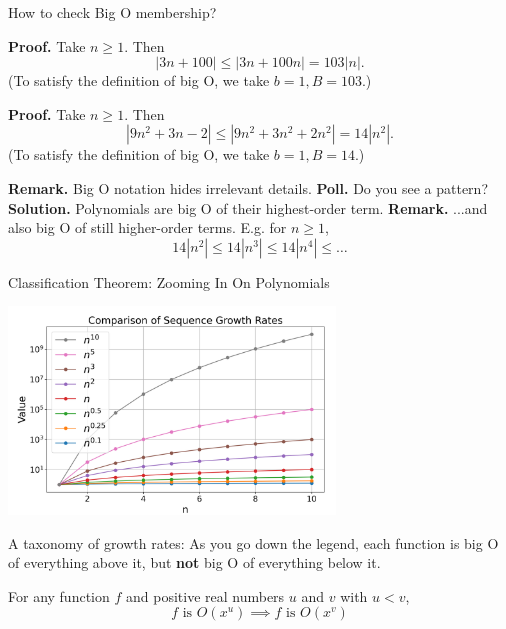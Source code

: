 \documentclass[10pt]{beamer}
\begin{document}
\begin{frame}{How to check Big O membership?}
\footnotesize 

\begin{mygreenbox}[title=\text{Example: $f(n) = 3n+100$ is $O(n)$}]
\textbf{Proof.} Take $n \geq 1$. Then 
\[ |3n+100| \leq  |3n+100n| = 103|n|.\]
\hfill (To satisfy the definition of big O, we take $b=1, B=103$.)
\end{mygreenbox}
\vspace{-.1cm}
\vfill 
\pause 
\begin{mygreenbox}[title=\text{Example: $f(n) = 9n^2+3n-2$ is $O(n^2)$.}]
\textbf{Proof.} Take $n \geq 1$. Then 
\[ |9n^2+3n-2| \leq  |9n^2+3n^2+2n^2| = 14|n^2|.\]
\hfill (To satisfy the definition of big O, we take $b=1, B=14$.)
\end{mygreenbox}
\small 
\vfill \pause 
\colorbox{red!30}{\textbf{Remark.}} Big O notation hides irrelevant details.
\vfill \pause 
\colorbox{yellow!30}{\textbf{Poll.}} Do you see a pattern?
\vfill \pause 
\colorbox{green!30}{\textbf{Solution.}} Polynomials are big O of their highest-order term.
\vfill \pause 
\colorbox{red!30}{\textbf{Remark.}} ...and also big O of still higher-order terms.   E.g. for $n \geq 1$,
\vspace{-.1cm}
\[14|n^2| \leq 14|n^3| \leq 14|n^4| \leq \hdots \]
\end{frame}



\begin{frame}{Classification Theorem: Zooming In On Polynomials}
\small 
\begin{center}
\includegraphics[width=0.65\textwidth]{images/big_O_polynomials.png}
\end{center}
\vfill 
\pause 
A taxonomy of growth rates: As you go down the legend, each function is big O of everything above it, but \textbf{not} big O of everything below it. \pause 
\vfill \pause 
\begin{myredbox}[title=Theorem]
For any function $f$ and positive real numbers $u$ and $v$ with $u<v$,
\[f \text{ is } O(x^u) \implies  f \text{ is } O(x^v)\]
\end{myredbox}

\end{frame}
\end{document}
